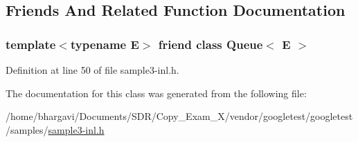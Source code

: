 \subsection{Friends And Related Function Documentation}
\subsubsection[{\texorpdfstring{Queue$<$ E $>$}{Queue< E >}}]{\setlength{\rightskip}{0pt plus 5cm}template$<$typename E$>$ friend class {\bf Queue}$<$ E $>$\hspace{0.3cm}{\ttfamily [friend]}}\hypertarget{class_queue_node_ad4336229b1d7c3626e4ba69f236b202d}{}\label{class_queue_node_ad4336229b1d7c3626e4ba69f236b202d}


Definition at line 50 of file sample3-\/inl.\+h.



The documentation for this class was generated from the following file\+:\begin{DoxyCompactItemize}
\item 
/home/bhargavi/\+Documents/\+S\+D\+R/\+Copy\+\_\+\+Exam\+\_\+X/vendor/googletest/googletest/samples/\hyperlink{sample3-inl_8h}{sample3-\/inl.\+h}\end{DoxyCompactItemize}
